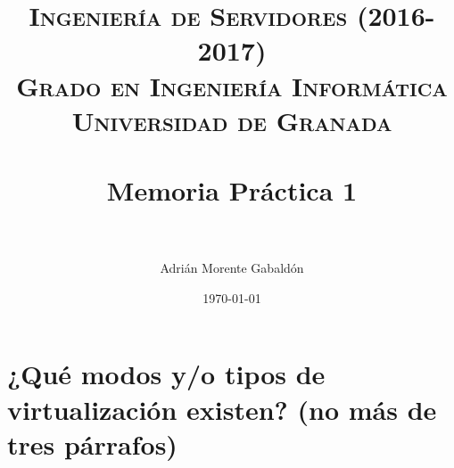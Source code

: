 


\title{
\normalfont \normalsize
\textsc{\textbf{Ingeniería de Servidores (2016-2017)} \\ Grado en Ingeniería Informática \\ Universidad de Granada} \\ [25pt] %
\horrule{0.5pt} \\[0.4cm] %
\huge Memoria Práctica 1 \\ %
\horrule{2pt} \\[0.5cm] %
}

\author{Adrián Morente Gabaldón} %

\date{\normalsize\today} %




\maketitle %

\newpage %

\tableofcontents %

\listoffigures

\listoftables

\newpage


\section{¿Qué modos y/o tipos de virtualización existen? (no más de tres párrafos)}

